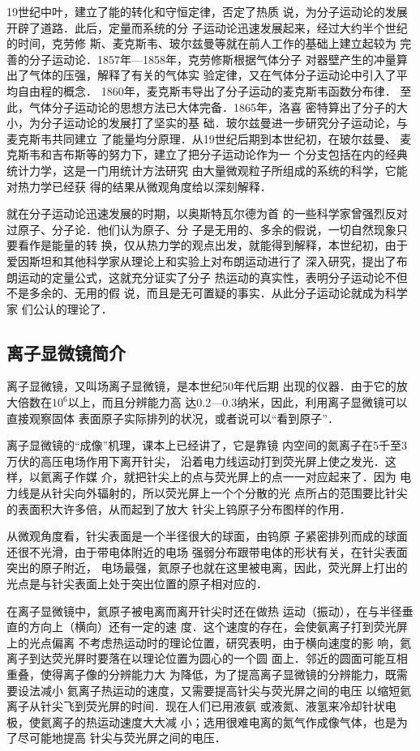 19世纪中叶，建立了能的转化和守恒定律，否定了热质
说，为分子运动论的发展开辟了道路．此后，定量而系统的分
子运动论迅速发展起来，经过大约半个世纪的时间，克劳修
斯、麦克斯韦、玻尔兹曼等就在前人工作的基础上建立起较为
完善的分子运动论．1857年—1858年，克劳修斯根据气体分子
对器壁产生的冲量算出了气体的压强，解释了有关的气体实
验定律，又在气体分子运动论中引入了平均自由程的概念．
1860年，麦克斯韦导出了分子运动的麦克斯韦函数分布律．
至此，气体分子运动论的思想方法已大体完备．1865年，洛喜
密特算出了分子的大小，为分子运动论的发展打了坚实的基
础．玻尔兹曼进一步研究分子运动论，与麦克斯韦共同建立
了能量均分原理．从19世纪后期到本世纪初，在玻尔兹曼、
麦克斯韦和吉布斯等的努力下，建立了把分子运动论作为一
个分支包括在内的经典统计力学，这是一门用统计方法研究
由大量微观粒子所组成的系统的科学，它能对热力学已经获
得的结果从微观角度给以深刻解释．

就在分子运动论迅速发展的时期，以奥斯特瓦尔德为首
的一些科学家曾强烈反对过原子、分子论．他们认为原子、分
子是无用的、多余的假说，一切自然现象只要看作是能量的转
换，仅从热力学的观点出发，就能得到解释，本世纪初，由于
爱因斯坦和其他科学家从理论上和实验上对布朗运动进行了
深入研究，提出了布朗运动的定量公式，这就充分证实了分子
热运动的真实性，表明分子运动论不但不是多余的、无用的假
说，而且是无可置疑的事实．从此分子运动论就成为科学家
们公认的理论了．

\subsection{离子显微镜简介}

离子显微镜，又叫场离子显微镜，是本世纪50年代后期
出现的仪器．由于它的放大倍数在$10^6$以上，而且分辨能力高
达0.2—0.3纳米，因此，利用离子显微镜可以直接观察固体
表面原子实际排列的状况，或者说可以“看到原子”．

离子显微镜的“成像”机理，课本上已经讲了，它是靠镜
内空间的氮离子在5千至3万伏的高压电场作用下离开针尖，
沿着电力线运动打到荧光屏上使之发光．这样，以氦离子作媒
介，就把针尖上的点与荧光屏上的点一一对应起来了．因为
电力线是从针尖向外辐射的，所以荧光屏上一个个分散的光
点所占的范围要比针尖的表面积大许多倍，从而起到了放大
针尖上钨原子分布图样的作用．

从微观角度看，针尖表面是一个半径很大的球面，由钨原
子紧密排列而成的球面还很不光滑，由于带电体附近的电场
强弱分布跟带电体的形状有关，在针尖表面突出的原子附近，
电场最强，氦原子也就在这里被电离，因此，荧光屏上打出的
光点是与针尖表面上处于突出位置的原子相对应的．

在离子显微镜中，氦原子被电离而离开针尖时还在做热
运动（振动），在与半径垂直的方向上（横向）还有一定的速
度．这个速度的存在，会使氨离子打到荧光屏上的光点偏离
不考虑热运动时的理论位置，研究表明，由于横向速度的影
响，氦离子到达荧光屏时要落在以理论位置为圆心的一个圆
面上．邻近的圆面可能互相重叠，使得离子像的分辨能力大
为降低，为了提高离子显微镜的分辨能力，既需要设法减小
氦离子热运动的速度，又需要提高针尖与荧光屏之间的电压
以缩短氦离子从针尖飞到荧光屏的时间．现在人们已用液氨
或液氮、液氢来冷却针状电极，使氦离子的热运动速度大大减
小；选用很难电离的氮气作成像气体，也是为了尽可能地提高
针尖与荧光屏之间的电压．

